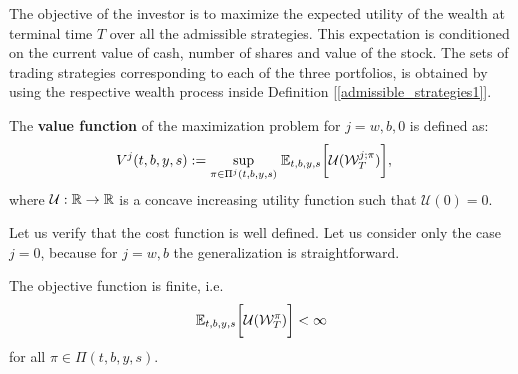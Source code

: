 The objective of the investor is to maximize the expected utility of the wealth at terminal time $T$ over all the admissible
strategies. This expectation is conditioned on the current value of cash, number of shares and value of the
stock.
The sets of trading strategies corresponding to each of the three portfolios, is obtained by using the respective wealth process inside Definition [\ref{admissible_strategies1}]. 

\begin{Definition}
 The \textbf{value function} of the maximization problem for $j=w,b,0$ is defined as:
\begin{align}\label{max_probl0}
V^j(t,b,y,s) := \sup_{\pi \in \Pi^j(t,b,y,s)} \; & \mathbb{E}_{t,b,y,s}\biggl[ 
            \mathcal{U}(\mathcal{W}^{j; \pi}_T) \biggr],             
\end{align}
where $\mathcal{U}: \mathbb{R} \to \mathbb{R}$ is a concave increasing utility function such that $\mathcal{U}(0)=0$.
\end{Definition}
Let us verify that the cost function is well defined. Let us consider only the case $j=0$, because for $j=w,b$ the generalization is straightforward.
\begin{Theorem}
The objective function is finite, i.e.
$$ \mathbb{E}_{t,b,y,s}\biggl[ \mathcal{U}(\mathcal{W}^{\pi}_T) \biggr] < \infty$$
for all $\pi \in \Pi(t,b,y,s)$.
\end{Theorem}

